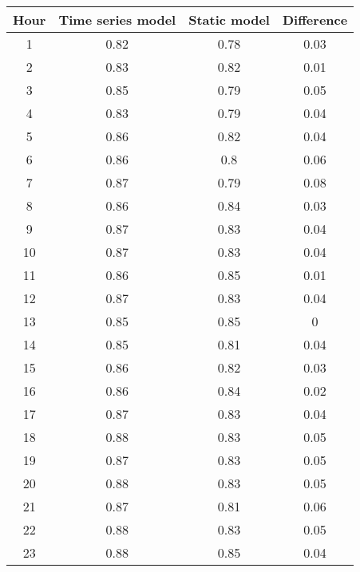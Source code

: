  \restoregeometry
%

\begin{table}[]
\centering
\begin{tabular}{|c|c c c|}
\hline
Hour & Time series model & Static model & Difference \\ \hline
1    & 0.82              & 0.78         & 0.03       \\
2    & 0.83              & 0.82         & 0.01       \\
3    & 0.85              & 0.79         & 0.05       \\
4    & 0.83              & 0.79         & 0.04       \\
5    & 0.86              & 0.82         & 0.04       \\
6    & 0.86              & 0.8          & 0.06       \\\hline
7    & 0.87              & 0.79         & 0.08       \\
8    & 0.86              & 0.84         & 0.03       \\
9    & 0.87              & 0.83         & 0.04       \\
10   & 0.87              & 0.83         & 0.04       \\
11   & 0.86              & 0.85         & 0.01       \\
12   & 0.87              & 0.83         & 0.04       \\\hline
13   & 0.85              & 0.85         & 0          \\
14   & 0.85              & 0.81         & 0.04       \\
15   & 0.86              & 0.82         & 0.03       \\
16   & 0.86              & 0.84         & 0.02       \\
17   & 0.87              & 0.83         & 0.04       \\
18   & 0.88              & 0.83         & 0.05       \\\hline
19   & 0.87              & 0.83         & 0.05       \\
20   & 0.88              & 0.83         & 0.05       \\
21   & 0.87              & 0.81         & 0.06       \\
22   & 0.88              & 0.83         & 0.05       \\
23   & 0.88              & 0.85         & 0.04       \\

\end{tabular}
\end{table}
